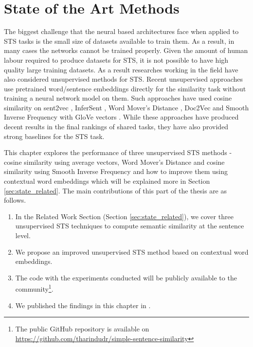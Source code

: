\chapter{\label{cha:sts_state_of_the_art_methods}State of the Art Methods}

The biggest challenge that the neural based architectures face when applied to STS tasks is the small size of datasets available to train them. As a result, in many cases the networks cannot be trained properly. Given the amount of human labour required to produce datasets for STS, it is not possible to have high quality large training datasets. As a result researches working in the field have also considered unsupervised methods for STS. Recent unsupervised approaches use pretrained word/sentence embeddings directly for the similarity task without training a neural network model on them. Such approaches have used cosine similarity on sent2vec \cite{pagliardini-etal-2018-unsupervised}, InferSent \cite{conneau-EtAl:2017:EMNLP2017}, Word Mover's Distance \cite{10.5555/3045118.3045221}, Doc2Vec \cite{10.5555/3044805.3045025} and Smooth Inverse Frequency with GloVe vectors \cite{DBLP:conf/iclr/AroraLM17}. While these approaches have produced decent results in the final rankings of shared tasks, they have also provided strong baselines for the STS task. 

This chapter explores the performance of three unsupervised STS methods - cosine similarity using average vectors, Word Mover's Distance \cite{10.5555/3045118.3045221} and cosine similarity using Smooth Inverse Frequency \cite{DBLP:conf/iclr/AroraLM17} and how to improve them using contextual word embeddings which will be explained more in Section \ref{sec:state_related}. The main contributions of this part of the thesis are as follows.

\begin{enumerate}
	\item In the Related Work Section (Section \ref{sec:state_related}), we cover three unsupervised STS techniques to compute semantic similarity at the sentence level. 
	
	\item We propose an improved unsupervised STS method based on contextual word embeddings. 
	
	\item The code with the experiments conducted will be publicly available to the community\footnote{The public GitHub repository is available on \url{https://github.com/tharindudr/simple-sentence-similarity}}.
	
	\item We published the findings in this chapter in \citet{ranasinghe-etal-2019-enhancing}.
	
\end{enumerate}

